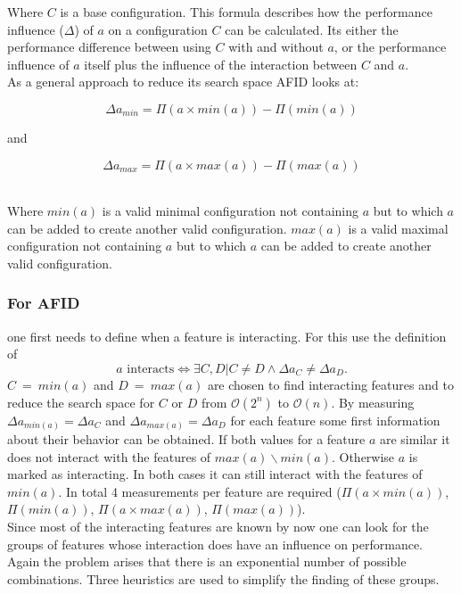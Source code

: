 Where $C$ is a base configuration. This formula describes how the performance influence ($\Delta$) of $a$ on a configuration $C$ can be calculated. Its either the performance difference between using $C$ with and without $a$, or the performance influence of $a$ itself plus the influence of the interaction between $C$ and $a$.\\
As a general approach to reduce its search space AFID looks at:\\
\begin{minipage}{\textwidth}
\begin{equation}
	\Delta a_{min} = \Pi(a \times min(a)) - \Pi(min(a))
\end{equation}
\begin{center}
	and
\end{center}
\begin{equation}
	\Delta a_{max} = \Pi(a \times max(a)) - \Pi(max(a))
\end{equation}
\end{minipage}\\[0.3cm]
 Where $min(a)$ is a valid minimal configuration not containing $a$ but to which $a$ can be added to create another valid configuration. $max(a)$ is a valid maximal configuration not containing $a$ but to which $a$ can be added to create another valid configuration.\\
 \subsubsection[Automated Feature Interaction Detection]{\textnormal{For} AFID} 
one first needs to define when a feature is interacting. For this \citet{AutomatedFeatureDetectionSiegmund2012} use the definition of 
 \begin{equation}
 a \text{ interacts} \Leftrightarrow \exists C,D | C \neq D  \land	 \Delta a_C \neq \Delta a_D .
 \end{equation}
 $C~=~min(a)$ and $D~=~max(a)$ are chosen to find interacting features and to reduce the search space for $C$ or $D$ from $\mathcal{O}(2^n)$ to $\mathcal{O}(n)$. By measuring $\Delta a_{min(a)}=\Delta a_C$ and $\Delta a_{max(a)}=\Delta a_D$ for each feature some first information about their behavior can be obtained. If both values for a feature $a$ are similar it does not interact with the features of $max(a)\backslash min(a)$. Otherwise $a$ is marked as interacting. In both cases it can still interact with the features of $min(a)$. In total 4 measurements per feature are required ($\Pi(a \times min(a))$, $\Pi(min(a))$, $\Pi(a\times max(a))$, $\Pi(max(a))$)\cite{AutomatedFeatureDetectionSiegmund2012}.\\
 Since most of the interacting features are known by now one can look for the groups of features whose interaction does have an influence on performance. Again the problem arises that there is an exponential number of possible combinations. Three heuristics are used to simplify the finding of these groups.
 
